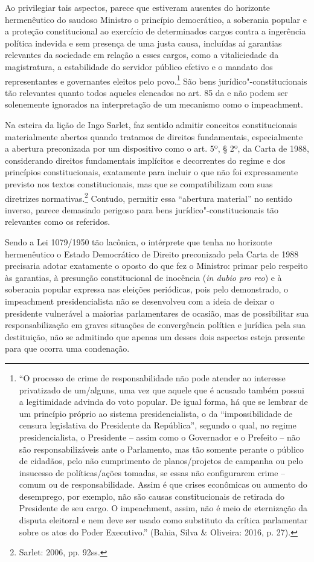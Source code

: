 Ao privilegiar tais aspectos, parece que estiveram ausentes do horizonte
hermenêutico do saudoso Ministro o princípio democrático, a soberania
popular e a proteção constitucional ao exercício de determinados cargos
contra a ingerência política indevida e sem presença de uma justa causa,
incluídas aí garantias relevantes da sociedade em relação a esses
cargos, como a vitaliciedade da magistratura, a estabilidade do servidor
público efetivo e o mandato dos representantes e governantes eleitos
pelo povo.\footnote{``O processo de crime de responsabilidade não pode
  atender ao interesse privatizado de um/alguns, uma vez que aquele que
  é acusado também possui a legitimidade advinda do voto popular. De
  igual forma, há que se lembrar de um princípio próprio ao sistema
  presidencialista, o da ``impossibilidade de censura legislativa do
  Presidente da República'', segundo o qual, no regime presidencialista,
  o Presidente -- assim como o Governador e o Prefeito -- não são
  responsabilizáveis ante o Parlamento, mas tão somente perante o
  público de cidadãos, pelo não cumprimento de planos/projetos de
  campanha ou pelo insucesso de políticas/ações tomadas, se essas não
  configurarem crime -- comum ou de responsabilidade. Assim é que crises
  econômicas ou aumento do desemprego, por exemplo, não são causas
  constitucionais de retirada do Presidente de seu cargo. O
  impeachment, assim, não é meio de eternização da disputa
  eleitoral e nem deve ser usado como substituto da crítica parlamentar
  sobre os atos do Poder Executivo.'' (Bahia, Silva \& Oliveira: 2016,
  p. 27).} São bens jurídico"-constitucionais tão relevantes quanto todos
aqueles elencados no art. 85 da  e não podem ser solenemente ignorados
na interpretação de um mecanismo como o impeachment.

Na esteira da lição de Ingo Sarlet, faz sentido admitir conceitos
constitucionais materialmente abertos quando tratamos de direitos
fundamentais, especialmente a abertura preconizada por um dispositivo
como o art. 5º, § 2º, da Carta de 1988, considerando direitos
fundamentais implícitos e decorrentes do regime e dos princípios
constitucionais, exatamente para incluir o que não foi expressamente
previsto nos textos constitucionais, mas que se compatibilizam com suas
diretrizes normativas.\footnote{Sarlet: 2006, pp. 92ss.} Contudo, permitir essa
``abertura material'' no sentido inverso, parece demasiado perigoso para
bens jurídico"-constitucionais tão relevantes como os referidos.

Sendo a Lei 1079/1950 tão lacônica, o intérprete que tenha no horizonte
hermenêutico o Estado Democrático de Direito preconizado pela Carta de
1988 precisaria adotar exatamente o oposto do que fez o Ministro: primar
pelo respeito às garantias, à presunção constitucional de inocência
(\emph{in dubio pro reo}) e à soberania popular expressa nas eleições
periódicas, pois pelo demonstrado, o impeachment presidencialista
não se desenvolveu com a ideia de deixar o presidente vulnerável a
maiorias parlamentares de ocasião, mas de possibilitar sua
responsabilização em graves situações de convergência política e
jurídica pela sua destituição, não se admitindo que apenas um desses
dois aspectos esteja presente para que ocorra uma condenação.

